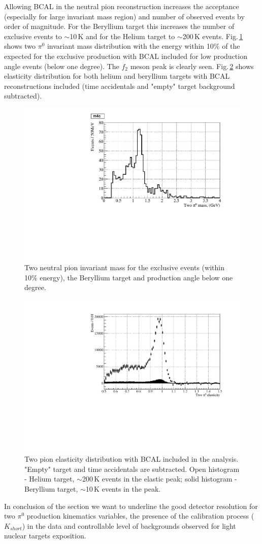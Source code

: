 Allowing BCAL in the neutral pion reconstruction increases the acceptance (especially for large invariant mass region) and number of observed events by order of magnitude. For the Beryllium target this increases the number of exclusive events to $\sim$10$\,$K and for the Helium target to $\sim$200$\,$K events. Fig.$\,$\ref{fig:bemass} shows two $\pi^0$ invariant mass distribution with the energy within 10$\%$ of the expected for the exclusive production with BCAL included for low production angle events (below one degree). The $f_2$ meson peak is clearly seen. Fig.$\,$\ref{fig:beheelast} shows elasticity distribution for both helium and beryllium targets with BCAL reconstructions included (time accidentals and "empty" target background subtracted).
\begin{figure}[!h]
\centering\includegraphics[width=4.75in]{figures/be_mass.pdf}
\caption{Two neutral pion invariant mass for the exclusive events (within 10\% energy), the Beryllium target and production angle below one degree.
\label{fig:bemass}}
\end{figure}
\begin{figure}[!h]
\centering\includegraphics[width=4.5in]{figures/hebe_elast.pdf}
\caption{Two pion elasticity distribution with BCAL included in the analysis. "Empty" target and time accidentals are subtracted. Open histogram - Helium target, $\sim$200$\,$K events in the elastic peak; solid histogram - Beryllium target, $\sim$10$\,$K events in the peak.
\label{fig:beheelast}}
\end{figure}


In conclusion of the section we want to underline the good detector resolution for two $\pi^0$ production kinematics variables, the presence of the calibration process ($K_{short}$) in the data and controllable level of backgrounds observed for light nuclear targets exposition.